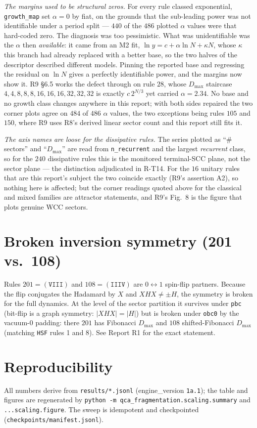 \documentclass[11pt]{article}
\newcommand{\rt}[1]{\texttt{#1}}
\begin{document}
\emph{The margins used to be structural zeros.} For every rule classed
exponential, \texttt{growth\_map} set $\alpha=0$ by fiat, on the grounds that the
sub-leading power was not identifiable under a period split --- $440$ of the
$486$ plotted $\alpha$ values were that hard-coded zero. The diagnosis was too
pessimistic. What was unidentifiable was the $\alpha$ then \emph{available}: it
came from an M2 fit, $\ln y = c+\alpha\ln N+\kappa N$, whose $\kappa$ this branch
had already replaced with a better base, so the two halves of the descriptor
described different models. Pinning the reported base and regressing the residual
on $\ln N$ gives a perfectly identifiable power, and the margins now show it.
R9 \S6.5 works the defect through on rule $28$, whose $D_{\max}$ staircase
$4,4,8,8,8,16,16,16,32,32,32$ is exactly $c\,2^{N/3}$ yet carried $\alpha=2.34$.
No base and no growth class changes anywhere in this report; with both sides
repaired the two corner plots agree on $484$ of $486$ $\alpha$ values, the two
exceptions being rules $105$ and $150$, where R9 uses R8's derived linear sector
count and this report still fits it.

\emph{The axis names are loose for the dissipative rules.} The series plotted as
``$\#$sectors'' and ``$D_{\max}$'' are read from \texttt{n\_recurrent} and the
largest \emph{recurrent} class, so for the $240$ dissipative rules this is the
monitored terminal-SCC plane, not the sector plane --- the distinction adjudicated
in R-T14. For the $16$ unitary rules that are this report's subject the two
coincide exactly (R9's assertion A2), so nothing here is affected; but the
corner readings quoted above for the classical and mixed families are attractor
statements, and R9's Fig.~8 is the figure that plots genuine WCC sectors.

\section{Broken inversion symmetry (201 vs.\ 108)}
Rules $201=(\rt{VIII})$ and $108=(\rt{IIIV})$ are $0\!\leftrightarrow\!1$
spin-flip partners. Because the flip conjugates the Hadamard by $X$ and
$XHX\neq\pm H$, the symmetry is broken for the full dynamics. At the level of the
sector partition it survives under \rt{pbc} (bit-flip is a graph symmetry: $|XHX|
=|H|$) but is broken under \rt{obc0} by the vacuum-0 padding: there $201$ has
Fibonacci $D_{\max}$ and $108$ shifted-Fibonacci $D_{\max}$ (matching \rt{HSF}
rules 1 and 8). See Report R1 for the exact statement.

\section{Reproducibility}
All numbers derive from \rt{results/*.jsonl} (engine\_version \texttt{1a.1});
the table and figures are regenerated by
\rt{python -m qca\_fragmentation.scaling.summary} and
\rt{...scaling.figure}. The sweep is idempotent and checkpointed
(\rt{checkpoints/manifest.jsonl}).
\end{document}
